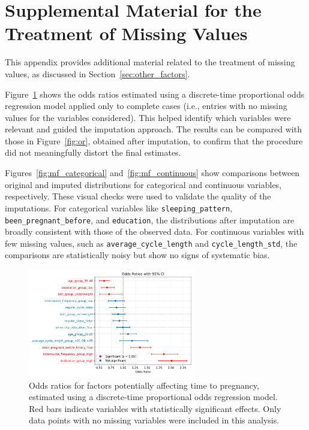 \documentclass[11pt]{article}
\begin{document}
\clearpage


\section{Supplemental Material for the Treatment of Missing Values}
\label{app:missing_variables}

This appendix provides additional material related to the treatment of missing values, as discussed in Section~\ref{sec:other_factors}. 

Figure~\ref{fig:or_missing_only} shows the odds ratios estimated using a discrete-time proportional odds regression model applied only to complete cases (i.e., entries with no missing values for the variables considered). This helped identify which variables were relevant and guided the imputation approach. The results can be compared with those in Figure~\ref{fig:or}, obtained after imputation, to confirm that the procedure did not meaningfully distort the final estimates.

Figures~\ref{fig:mf_categorical} and~\ref{fig:mf_continuous} show comparisons between original and imputed distributions for categorical and continuous variables, respectively. These visual checks were used to validate the quality of the imputations. For categorical variables like \texttt{sleeping\_pattern}, \texttt{been\_pregnant\_before}, and \texttt{education}, the distributions after imputation are broadly consistent with those of the observed data. For continuous variables with few missing values, such as \texttt{average\_cycle\_length} and \texttt{cycle\_length\_std}, the comparisons are statistically noisy but show no signs of systematic bias.


\begin{figure}[h]
  \centering
  \includegraphics[width=0.65\textwidth]{plots/OR_missing_included.jpg}
  \caption{
    Odds ratios for factors potentially affecting time to pregnancy, estimated using a discrete-time proportional odds regression model. Red bars indicate variables with statistically significant effects. Only data points with no missing variables were included in this analysis.
  }
  \label{fig:or_missing_only}
\end{figure}
\end{document}
